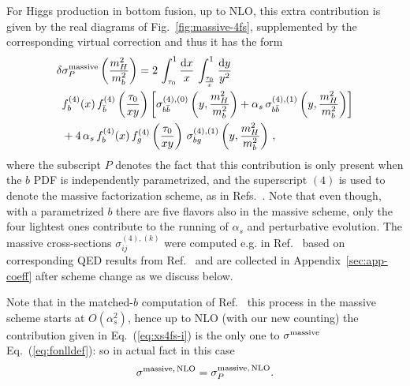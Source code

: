 For Higgs production in bottom fusion, up to NLO, this extra
contribution is given by
the real diagrams of Fig.~\ref{fig:massive-4fs}, supplemented
by the corresponding virtual correction and thus it
has the form
\begin{equation}
  \label{eq:xs4fs-i}
  \begin{split}
    \delta&\sigma_P^{\rm massive}\left(\frac{m_H^2}{m_b^2}\right) = 
    2\,\int_{\tau_0}^1 \frac{{\rm d}{x}}{x}\,
    \int_{\frac{\tau_0}{x}}^1 \frac{{\rm d}{y}}{y^2}\, \\
    &f^{(4)}_b(x)\,f^{(4)}_{\bar{b}}\left(\frac{\tau_0}{xy}\right)
    \biggl[\sigma_{b\bar{b}}^{(4),(0)}\left(y,\frac{m_H^2}{m_b^2}\right) +
      \alpha_s\,\sigma_{b\bar{b}}^{(4),(1)}\left(y,\frac{m_H^2}{m_b^2}\right)
    \biggr]\\
    &
    +
    4\,\alpha_s\,f^{(4)}_b(x)\,f^{(4)}_g\left(\frac{\tau_0}{xy}\right)\,
    \sigma_{bg}^{(4),(1)}\left(y,\frac{m_H^2}{m_b^2}\right)\,,
  \end{split}
\end{equation}
where the subscript $P$ denotes the fact that this contribution is
only present when the $b$ PDF is independently parametrized, and the
superscript $(4)$ is used to denote the massive factorization scheme,
as in Refs.~\cite{Forte:2015hba,Forte:2016sja}. Note that even though,
with a parametrized $b$ there are five flavors also in
the massive scheme, only the four lightest ones contribute to
the running of $\alpha_s$ and perturbative evolution. The
massive cross-sections $\sigma_{ij}^{(4),(k)}$ were computed e.g. in
Ref.~\cite{Krauss:2017wmx} based on corresponding QED results from
Ref.~\cite{Dittmaier:1999mb} and are collected in
Appendix~\ref{sec:app-coeff} after scheme change as we discuss below.

Note that in the matched-$b$ computation
of Ref.~\cite{Forte:2015hba,Forte:2016sja} this
process  in the massive scheme starts at $O(\alpha_s^2)$, hence up to NLO (with our new
counting) the contribution given in Eq.~(\ref{eq:xs4fs-i}) is the only
one to $\sigma^{\rm massive}$ Eq.~(\ref{eq:fonlldef}): so in actual fact
in this case
\begin{equation}
   \sigma^{\rm massive,\,NLO}= \sigma^{\rm massive,\,NLO}_{P}.
\end{equation}

